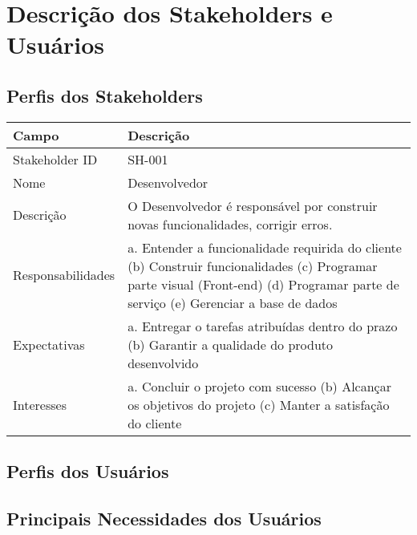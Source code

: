 \chapter{Descrição dos Stakeholders e Usuários}

\section{Perfis dos Stakeholders}

\begin{table}[htbp]
\begin{tabularx}{\textwidth}{lX}
\hline
Campo             & Descrição                                                                                                                                                                           \\ \hline
Stakeholder ID    & SH-001                                                                                                                                                                              \\ \hline
Nome              & Desenvolvedor                                                                                                                                                                       \\ \hline
Descrição         & O Desenvolvedor é responsável por construir novas funcionalidades, corrigir erros.                                                                                                  \\ \hline
Responsabilidades & a. Entender a funcionalidade requirida do cliente (b) Construir funcionalidades (c) Programar parte visual (Front-end) (d) Programar parte de serviço (e) Gerenciar a base de dados \\ \hline
Expectativas      & a. Entregar o tarefas atribuídas dentro do prazo (b) Garantir a qualidade do produto desenvolvido                                                                                   \\ \hline
Interesses        & a. Concluir o projeto com sucesso (b) Alcançar os objetivos do projeto (c) Manter a satisfação do cliente                                                                           \\ \hline
\end{tabularx}

\end{table}   



\section{Perfis dos Usuários}
\section{Principais Necessidades dos Usuários}
